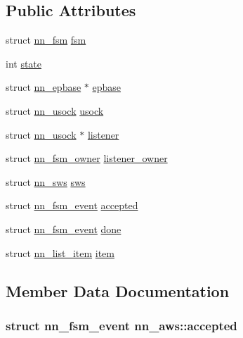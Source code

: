 \subsection*{Public Attributes}
\begin{DoxyCompactItemize}
\item 
struct \hyperlink{structnn__fsm}{nn\+\_\+fsm} \hyperlink{structnn__aws_a4dbdd1d180d0932049d668ef2326dbca}{fsm}
\item 
int \hyperlink{structnn__aws_a13068d88fe20b331e7f1775299bb36a0}{state}
\item 
struct \hyperlink{structnn__epbase}{nn\+\_\+epbase} $\ast$ \hyperlink{structnn__aws_aaa7afd36f1c5caae0c8a6c07ba8120e5}{epbase}
\item 
struct \hyperlink{structnn__usock}{nn\+\_\+usock} \hyperlink{structnn__aws_a994654d46043ffffb5c50a26418f07be}{usock}
\item 
struct \hyperlink{structnn__usock}{nn\+\_\+usock} $\ast$ \hyperlink{structnn__aws_ae45d418c32177d2cb4a170045790c0bb}{listener}
\item 
struct \hyperlink{structnn__fsm__owner}{nn\+\_\+fsm\+\_\+owner} \hyperlink{structnn__aws_ab87ccbd6d0da109f5bf1bd2ce76b031c}{listener\+\_\+owner}
\item 
struct \hyperlink{structnn__sws}{nn\+\_\+sws} \hyperlink{structnn__aws_a3a332be24b129cd1cbc6e6a224d3400e}{sws}
\item 
struct \hyperlink{structnn__fsm__event}{nn\+\_\+fsm\+\_\+event} \hyperlink{structnn__aws_a1f2a18aebfe209a2eb034ef8030c0f25}{accepted}
\item 
struct \hyperlink{structnn__fsm__event}{nn\+\_\+fsm\+\_\+event} \hyperlink{structnn__aws_a4d64e57f3bd783385b45203c3d4b7197}{done}
\item 
struct \hyperlink{structnn__list__item}{nn\+\_\+list\+\_\+item} \hyperlink{structnn__aws_a6e4050f21493a55997811caf94b3f6f6}{item}
\end{DoxyCompactItemize}


\subsection{Member Data Documentation}
\subsubsection[{accepted}]{\setlength{\rightskip}{0pt plus 5cm}struct {\bf nn\+\_\+fsm\+\_\+event} nn\+\_\+aws\+::accepted}\hypertarget{structnn__aws_a1f2a18aebfe209a2eb034ef8030c0f25}{}\label{structnn__aws_a1f2a18aebfe209a2eb034ef8030c0f25}
